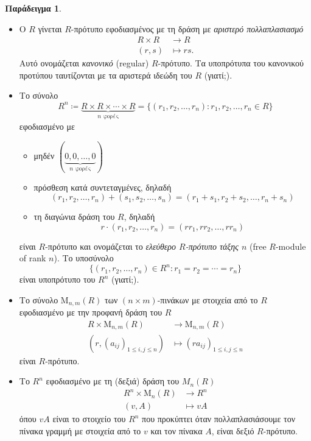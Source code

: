 \documentclass[12pt,a4paper,reqno]{amsart}
\theoremstyle{definition}
\newtheorem{example}[theorem]{Παράδειγμα}
\theoremstyle{remark}
\numberwithin{theorem}{section}
\numberwithin{exercise}{section}
\numberwithin{equation}{section}
\newcommand{\rmM}{\mathrm{M}}
\renewcommand{\to}{\rightarrow}
\begin{document}
\begin{example}
    \label{ex:modules}
    \leavevmode
    \begin{itemize}
        \item[(α)] Ο $R$ γίνεται $R$-πρότυπο εφοδιασμένος με τη δράση με \emph{αριστερό πολλαπλασιασμό}
        \begin{align*}
        R \times R &\to R \\ 
             (r,s) &\mapsto rs.
        \end{align*}
        Αυτό ονομάζεται \emph{κανονικό} (regular) $R$-πρότυπο. Τα υποπρότυπα του κανονικού προτύπου ταυτίζονται με τα αριστερά ιδεώδη του $R$ (γιατί;).
        \item[(β)] Το σύνολο 
        \[
        R^n \coloneqq \underbrace{R\times{R}\times\cdots\times{R}}_{\text{$n$ φορές}} = \{(r_1, r_2, \dots, r_n) : r_1, r_2, \dots, r_n \in R\}
        \]
        εφοδιασμένο με 
        \begin{itemize}
            \item μηδέν $(\underbrace{0,0, \dots, 0}_{\text{$n$ φορές}})$
            \item πρόσθεση κατά συντεταγμένες, δηλαδή 
            \[
            (r_1, r_2, \dots, r_n) + (s_1, s_2, \dots, s_n) = (r_1+s_1, r_2+s_2, \dots, r_n+s_n)
            \]
            \item τη διαγώνια δράση του $R$, δηλαδή 
            \[
            r\cdot(r_1, r_2,\dots, r_n) = (rr_1, rr_2, \dots, rr_n)
            \]
        \end{itemize}
        είναι $R$-πρότυπο και ονομάζεται το \emph{ελεύθερο $R$-πρότυπο τάξης $n$} (free $R$-module of rank $n$). Το υποσύνολο 
        \[
        \{(r_1,r_2, \dots, r_n) \in R^n : r_1 = r_2 = \cdots = r_n\}
        \]
        είναι υποπρότυπο του $R^n$ (γιατί;).
        \item[(γ)] Το σύνολο $\rmM_{n,m}(R)$ των $(n\times{m})$-πινάκων με στοιχεία από το $R$ εφοδιασμένο με την προφανή δράση του $R$
        \begin{align*}
        R \times \rmM_{n,m}(R) &\to \rmM_{n,m}(R) \\ 
             (r,\left(a_{ij}\right)_{1\le i,j \le n}) &\mapsto \left(ra_{ij}\right)_{1\le i,j \le n}
        \end{align*}
        είναι $R$-πρότυπο.
        \item[(δ)] Το $R^n$ εφοδιασμένο με τη (δεξιά) δράση του $M_n(R)$ 
        \begin{align*}
        R^n \times \rmM_n(R) &\to R^n \\ 
             (v,A) &\mapsto vA
        \end{align*}
        όπου $vA$ είναι το στοιχείο του $R^n$ που προκύπτει όταν πολλαπλασιάσουμε τον πίνακα γραμμή με στοιχεία από το $v$ και τον πίνακα $A$, είναι δεξιό $R$-πρότυπο.
    \end{itemize}
\end{example}
\end{document}
